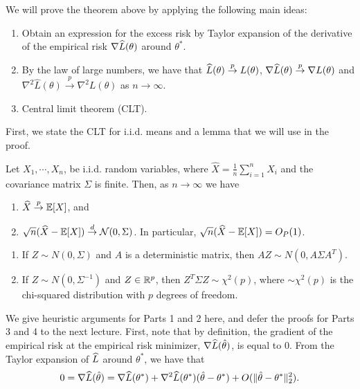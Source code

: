 
We will prove the theorem above by applying the following main ideas:
\begin{enumerate}
    \item Obtain an expression for the excess risk by Taylor expansion of the derivative of the empirical risk $\nabla \widehat{L}(\theta)$ around $\theta^{*}$.
    \item By the law of large numbers, we have that $\widehat{L}(\theta) \overset{p}{\to} L(\theta)$, $\nabla\widehat{L}(\theta) \overset{p}{\to} \nabla L(\theta)$   and  $\nabla^{2}\hat{L}(\theta) \overset{p}{\to} \nabla^{2} L(\theta)$ as $n \to \infty$.
    
    \item Central limit theorem (CLT).
\label{ideas}
\end{enumerate}
 
First, we state the CLT for i.i.d. means and a lemma that we will use in the proof.

\begin{theorem} \label{lec1:thm:CLT}
Let $X_1, \cdots, X_n$, be i.i.d. random variables, where $\widehat{X}=\frac{1}{n} \sum_{i=1}^{n} X_i$ and the covariance matrix $\Sigma$ is finite. Then, as $n \to \infty$ we have
\begin{enumerate}
    \item $\widehat{X} \overset{p}{\to} \mathbb{E}[X]$, and
    \item $\sqrt{n} (\widehat{X}-\mathbb{E}[X]) \overset{d}{\to} \mathcal{N}(0,\Sigma)$. In particular, $\sqrt{n} (\widehat{X}-\mathbb{E}[X]) = O_P(1)$.
\end{enumerate}
\end{theorem}

\begin{lemma}\label{lec1:lem:dist}
\quad\quad
    \begin{enumerate}
        \item If $Z \sim N(0, \Sigma)$ and $A$ is a deterministic matrix, then $AZ \sim N(0, A \Sigma A^T)$.
        
        \item If $Z \sim N(0, \Sigma^{-1})$ and $Z \in \mathbb R^p$, then $Z^T \Sigma Z \sim \chi^2(p)$, where $\sim \chi^2(p)$ is the chi-squared distribution with $p$ degrees of freedom.
    \end{enumerate}
\end{lemma}


We give heuristic arguments for Parts 1 and 2 here, and defer the proofs for Parts 3 and 4 to the next lecture. First, note that by definition, the gradient of the empirical risk at the empirical risk minimizer, $\nabla \widehat{L}(\hat{\theta})$, is equal to $0$. From the Taylor expansion of $\widehat{L}$ around $\theta^*$, we have that 
\begin{align}
    0 = \nabla \widehat{L}(\hat{\theta}) = \nabla \widehat{L}(\theta^*) + \nabla^2 \widehat{L}(\theta^*)(\hat{\theta} - \theta^*) + O(\|\hat{\theta} - \theta^*\|^2_2).
\end{align}

